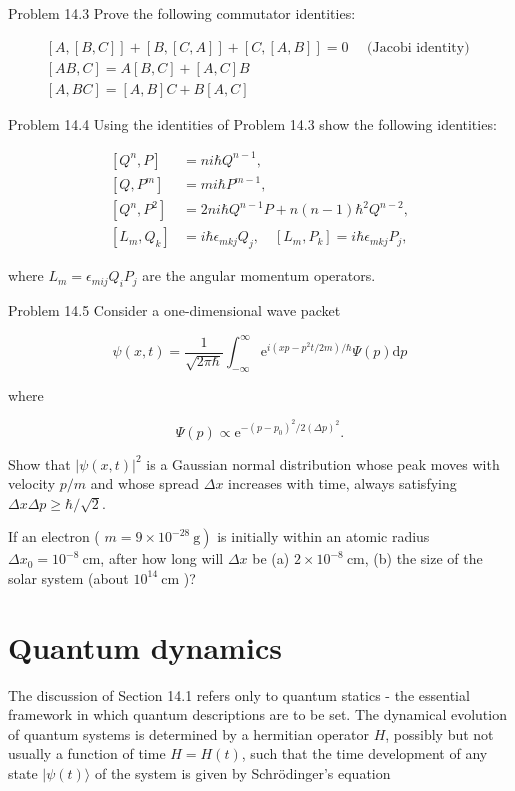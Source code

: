 \documentclass[10pt]{article}
\begin{document}
Problem 14.3 Prove the following commutator identities:

$$
\begin{gathered}
{[A,[B, C]]+[B,[C, A]]+[C,[A, B]]=0 \quad \text { (Jacobi identity) }} \\
{[A B, C]=A[B, C]+[A, C] B} \\
{[A, B C]=[A, B] C+B[A, C]}
\end{gathered}
$$

Problem 14.4 Using the identities of Problem 14.3 show the following identities:

$$
\begin{aligned}
{\left[Q^{n}, P\right] } & =n i \hbar Q^{n-1}, \\
{\left[Q, P^{m}\right] } & =m i \hbar P^{m-1}, \\
{\left[Q^{n}, P^{2}\right] } & =2 n i \hbar Q^{n-1} P+n(n-1) \hbar^{2} Q^{n-2}, \\
{\left[L_{m}, Q_{k}\right] } & =i \hbar \epsilon_{m k j} Q_{j}, \quad\left[L_{m}, P_{k}\right]=i \hbar \epsilon_{m k j} P_{j},
\end{aligned}
$$

where $L_{m}=\epsilon_{m i j} Q_{i} P_{j}$ are the angular momentum operators.

Problem 14.5 Consider a one-dimensional wave packet

$$
\psi(x, t)=\frac{1}{\sqrt{2 \pi \hbar}} \int_{-\infty}^{\infty} \mathrm{e}^{i\left(x p-p^{2} t / 2 m\right) / \hbar} \Psi(p) \mathrm{d} p
$$

where

$$
\Psi(p) \propto \mathrm{e}^{-\left(p-p_{0}\right)^{2} / 2(\Delta p)^{2}} .
$$

Show that $|\psi(x, t)|^{2}$ is a Gaussian normal distribution whose peak moves with velocity $p / m$ and whose spread $\Delta x$ increases with time, always satisfying $\Delta x \Delta p \geq \hbar / \sqrt{2}$.

If an electron ( $\left.m=9 \times 10^{-28} \mathrm{~g}\right)$ is initially within an atomic radius $\Delta x_{0}=10^{-8} \mathrm{~cm}$, after how long will $\Delta x$ be (a) $2 \times 10^{-8} \mathrm{~cm}$, (b) the size of the solar system (about $10^{14} \mathrm{~cm}$ )?

\section{Quantum dynamics}
The discussion of Section 14.1 refers only to quantum statics - the essential framework in which quantum descriptions are to be set. The dynamical evolution of quantum systems is determined by a hermitian operator $H$, possibly but not usually a function of time $H=H(t)$, such that the time development of any state $|\psi(t)\rangle$ of the system is given by Schrödinger's equation
\end{document}
